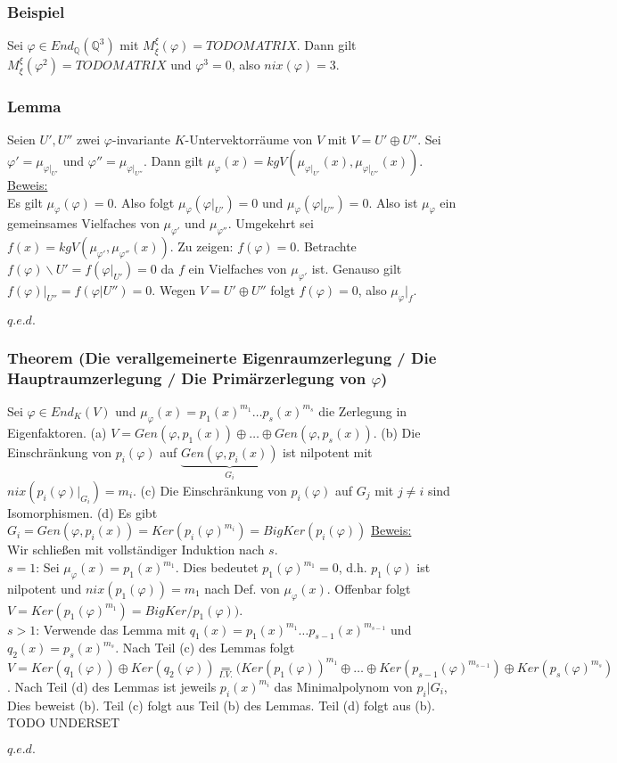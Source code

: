 \documentclass[a4paper]{article}
\newcommand{\ul}{\underline}
\renewcommand{\qed}{\begin{flushright}
\ul{\(q.e.d.\)}
\end{flushright}}
\let\phi\varphi
\begin{document}
\subsubsection{Beispiel}
Sei \(\phi\in End_\mathbb{Q}(\mathbb{Q}^3)\) mit \(M_\xi^\xi(\phi)= TODO MATRIX\). Dann gilt \(M_\xi^\xi(\phi^2)=TODO MATRIX\) und \(\phi^3=0\), also \(nix(\phi)=3\).
\subsubsection{Lemma}
Seien \(U', U''\) zwei \(\phi\)-invariante \(K\)-Untervektorräume von \(V\) mit \(V=U' \oplus U''\).
Sei \(\phi'=\mu_{\phi \Big|_{U'}}\) und \(\phi''=\mu_{\phi \Big|_{U''}}\). Dann gilt \(\mu_\phi(x)=kgV(\mu_{\phi \Big|_{U'}}(x),\mu_{\phi \Big|_{U''}}(x))\).\\
\ul{Beweis:}\\
Es gilt \(\mu_\phi(\phi)=0\). Also folgt \(\mu_\phi(\phi\Big|_{U'})=0\) und \(\mu_\phi(\phi \Big|_{U''})=0\). Also ist \(\mu_\phi\) ein gemeinsames Vielfaches von \(\mu_{\phi'}\) und \(\mu_{\phi''}\). Umgekehrt sei \(f(x)=kgV(\mu_{\phi'},\mu_{\phi''}(x))\). Zu zeigen: \(f(\phi)=0\). Betrachte \(f(\phi)\backslash U'=f(\phi \Big|_{U'})=0\) da \(f\) ein Vielfaches von \(\mu_{\phi'}\) ist. Genauso gilt \(f(\phi) \Big|_{U''}=f(\phi|U'')=0\). Wegen \(V=U' \oplus U''\) folgt \(f(\phi)=0\), also \(\mu_\phi \Big|_{f}\).
\qed
\subsubsection{Theorem (Die verallgemeinerte Eigenraumzerlegung / Die Hauptraumzerlegung / Die Primärzerlegung von \(\phi\))}
Sei \(\phi\in End_K(V)\) und \(\mu_\phi(x)=p_1(x)^{m_1}\dots p_s(x)^{m_s}\) die Zerlegung in Eigenfaktoren.
(a) \(V=Gen(\phi,p_1(x)) \oplus \dots \oplus Gen(\phi, p_s(x))\).
(b) Die Einschränkung von \(p_i(\phi)\) auf \(\underbrace{Gen(\phi,p_i(x))}_{G_i}\) ist nilpotent mit \(nix(p_i(\phi)\Big|_{G_i})=m_i\).
(c) Die Einschränkung von \(p_i(\phi)\) auf \(G_j\) mit \(j \neq i\) sind Isomorphismen.
(d) Es gibt \(G_i=Gen(\phi,p_i(x))=Ker(p_i(\phi)^{m_i})=BigKer(p_i(\phi))\)
\ul{Beweis:}\\
Wir schließen mit vollständiger Induktion nach \(s\).\\
\ul{\(s=1\)}: Sei \(\mu_\phi(x)=p_1(x)^{m_1}\). Dies bedeutet \(p_1(\phi)^{m_1}=0\), d.h. \(p_1(\phi)\) ist nilpotent und \(nix(p_1(\phi))=m_1\) nach Def. von \(\mu_\phi(x)\). Offenbar folgt \(V=Ker(p_1(\phi)^{m_1})=BigKer/p_1(\phi))\).\\
\ul{\(s > 1\)}: Verwende das Lemma mit \(q_1(x)=p_1(x)^{m_1}\dots p_{s-1}(x)^{m_{s-1}}\) und \(q_2(x)=p_s(x)^{m_s}\). Nach Teil (c) des Lemmas folgt \(V=Ker(q_1(\phi)) \oplus Ker(q_2(\phi))\underset{I.V.}{=}(Ker(p_1(\phi))^{m_1} \oplus \dots \oplus Ker(p_{s-1}(\phi)^{m_{s-1}}) \oplus Ker(p_s(\phi)^{m_s})\). Nach Teil (d) des Lemmas ist jeweils \(p_i(x)^{m_i}\) das Minimalpolynom von \(p_i|G_i\), Dies beweist (b). Teil (c) folgt aus Teil (b) des Lemmas. Teil (d) folgt aus (b).
TODO UNDERSET
\qed
\end{document}
